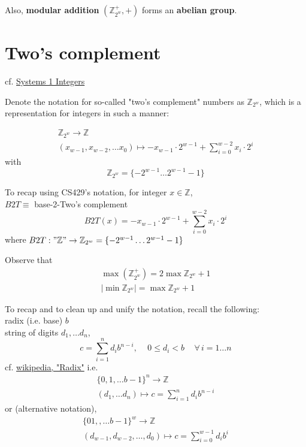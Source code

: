 \documentclass[10pt]{amsart}
\begin{document}
\begin{multicols*}{2}
Also, \textbf{modular addition} $(\mathbb{Z}^+_{2^w}, +)$ forms an \textbf{abelian group}.

\section{Two's complement}

cf. \href{https://www.cs.utexas.edu/users/fussell/courses/cs429h/lectures/Lecture_3-429h.pdf}{Systems 1 Integers}

Denote the notation for so-called "two's complement" numbers as $\mathbb{Z}_{2^w}$, which is a representation for integers in such a manner:

\begin{equation}
\begin{gathered}
\mathbb{Z}_{2^w} \to \mathbb{Z} \\
(x_{w-1}, x_{w-2}, \dots x_0) \mapsto -x_{w-1} \cdot 2^{w-1} + \sum_{i=0}^{w-2} x_i \cdot 2^i
\end{gathered}
\end{equation}
with
\begin{equation}
\mathbb{Z}_{2^w} = \lbrace - 2^{w-1} \dots 2^{w-1} -1 \rbrace
\end{equation}

To recap using CS429's notation, for integer $x \in \mathbb{Z}$, \\
$B2T \equiv $ base-2-Two's complement \\
\[
B2T(x) = -x_{w-1} \cdot 2^{w-1} + \sum_{i=0}^{w-2} x_i \cdot 2^i
\]
where $B2T: "\mathbb{Z}" \to \mathbb{Z}_{2^w} = \lbrace -2^{w-1} \dots 2^{w-1} - 1 \rbrace$

Observe that 
\begin{equation}
\begin{gathered}
\max{ \left( \mathbb{Z}^+_{2^w} \right) } = 2 \max{ \mathbb{Z}_{2^w} } + 1 \\
| \min{ \mathbb{Z}_{2^w} } | = \max{ \mathbb{Z}_{2^w} } + 1
\end{gathered}
\end{equation}

To recap and to clean up and unify the notation, recall the following: \\
radix (i.e. base) $b$ \\
string of digits $d_1, \dots d_n$, 
\[
c = \sum_{i=1}^n d_i b^{n-i} , \quad \, 0 \leq d_i < b \quad \, \forall \, i = 1 \dots n
\]
cf. \href{https://en.wikipedia.org/wiki/Radix}{wikipedia, "Radix"}
i.e.
\[
\begin{gathered}
\lbrace 0 ,1 ,\dots b-1 \rbrace^n \to \mathbb{Z} \\ 
(d_1, \dots d_n) \mapsto c = \sum_{i=1}^n d_i b^{n-i}
\end{gathered}
\]
or (alternative notation),
\[
\begin{gathered}
\lbrace 0 1, ,\dots b-1 \rbrace^w \to \mathbb{Z} \\ 
(d_{w-1}, d_{w-2}, \dots, d_0) \mapsto c = \sum_{i=0}^{w-1} d_i b^i 
\end{gathered}
\]


\end{multicols*}
\end{document}
